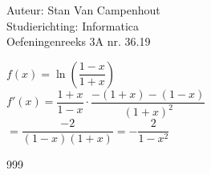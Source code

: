 \documentclass[a4paper]{article}
\begin{document}
  
\noindent \large Auteur: Stan Van Campenhout \\
\noindent \large Studierichting:  Informatica\\
\noindent \large Oefeningenreeks 3A nr. 36.19\\

\medskip

\normalsize

$ f(x) = \ln \left(\dfrac{1 - x}{1 + x}\right) $\\

$ f'(x) =  \dfrac{1 + x}{1 - x} \cdot \dfrac{-\left(1 + x\right) - \left(1 - x\right)}{\left(1 + x\right)^2} $\\

$ = \dfrac{-2}{\left(1 - x\right)\left(1 + x\right)} = -\dfrac{2}{1 - x^2} $\\

\begin{thebibliography}{999}
\end{thebibliography}
\end{document}

